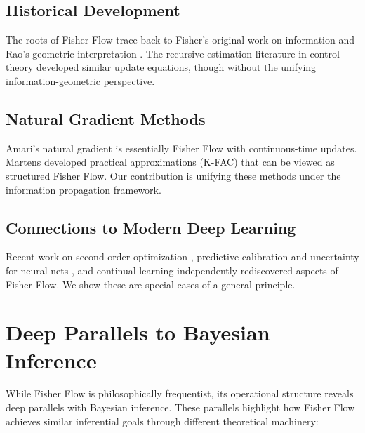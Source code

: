 \documentclass[11pt]{article}
\begin{document}
\subsection{Historical Development}

The roots of Fisher Flow trace back to Fisher's original work on information \cite{fisher1925statistical} and Rao's geometric interpretation \cite{rao1945information}. The recursive estimation literature in control theory \cite{ljung1983theory} developed similar update equations, though without the unifying information-geometric perspective.

\subsection{Natural Gradient Methods}

Amari's natural gradient \cite{amari1998natural} is essentially Fisher Flow with continuous-time updates. Martens \cite{martens2015optimizing} developed practical approximations (K-FAC) that can be viewed as structured Fisher Flow. Our contribution is unifying these methods under the information propagation framework.

\subsection{Connections to Modern Deep Learning}

Recent work on second-order optimization \cite{martens2015optimizing}, predictive calibration and uncertainty for neural nets \cite{guo2017calibration}, and continual learning \cite{kirkpatrick2017overcoming} independently rediscovered aspects of Fisher Flow. We show these are special cases of a general principle.

\section{Deep Parallels to Bayesian Inference}

While Fisher Flow is philosophically frequentist, its operational structure reveals deep parallels with Bayesian inference. These parallels highlight how Fisher Flow achieves similar inferential goals through different theoretical machinery:
\end{document}
